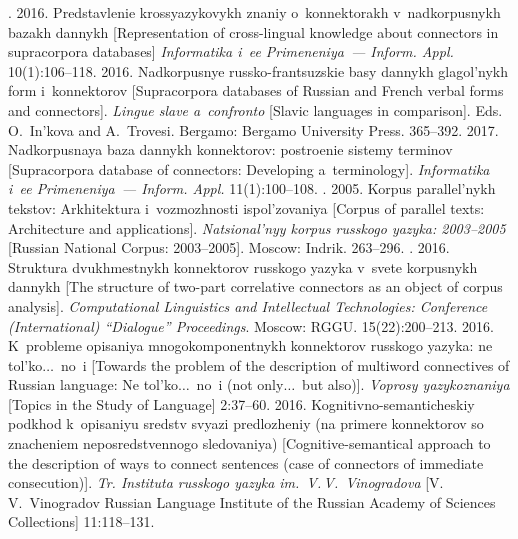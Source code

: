 \begin{multicols}{2}
{{\begin{thebibliography}{99}
. 2016. Predstavlenie krossyazykovykh zna\-niy 
o~konnektorakh v~nadkorpusnykh bazakh dannykh [Representation of  
cross-lingual knowledge about connectors in supracorpora databases] 
\textit{Informatika i~ee Primeneniya~--- Inform. Appl.} 10(1):106--118.
 2016. {Nad\-kor\-pus\-nye  
russko-frantsuzskie basy dannykh gla\-gol'\-nykh form i~konnektorov} 
[Supracorpora databases of Russian and French verbal forms and connectors]. 
\textit{Lingue slave a~confronto} [Slavic languages in comparison]. 
Eds. O.~In'kova and A.~Trovesi. Bergamo: 
Bergamo University Press. 365--392.
 2017. 
Nadkorpusnaya baza dannykh konnektorov: po\-stro\-enie sistemy terminov 
[Supracorpora database of connectors: Developing a~terminology]. 
\textit{Informatika i~ee Primeneniya~--- Inform. Appl.} 11(1):100--108.
. 2005. Korpus 
parallel'nykh tekstov: Arkhitektura i~voz\-mozh\-no\-sti ispol'zovaniya [Corpus of 
parallel texts: Architecture and applications]. \textit{Natsional'nyy korpus 
russkogo yazyka: 2003--2005} [Russian National Corpus: 2003--2005]. 
Moscow: Indrik. 263--296.
. 2016. Struktura dvukhmestnykh 
konnektorov russkogo yazyka v~svete kor\-pus\-nykh dannykh [The structure of 
two-part correlative connectors as an object of corpus analysis]. 
\textit{Computational Linguistics and 
Intellectual Technologies: Conference (International) ``Dialogue'' Proceedings}. 
Moscow: RGGU. 15(22):200--213.
 2016. K~probleme opisaniya mnogokomponentnykh 
konnektorov russkogo yazyka: ne tol'ko$\ldots$\  no~i [Towards the problem of 
the description of multiword connectives of Russian language: Ne 
tol'ko$\ldots$\  no~i (not only$\ldots$\  but also)]. \textit{Voprosy 
yazykoznaniya} [Topics in the Study of Language] 2:37--60.
 2016. Kognitivno-semanticheskiy podkhod 
k~opisaniyu sredstv svyazi predlozheniy (na primere konnektorov so 
znacheniem neposredstvennogo sle\-do\-va\-niya) [Cognitive-semantical approach 
to the description of ways to connect sentences (case of connectors of 
immediate consecution)]. \textit{Tr. Instituta russkogo yazyka im.\ 
V.\,V.~Vinogradova}
[V.\,V.~Vinogradov Russian Language Institute of the Russian Academy of 
Sciences Collections] 11:118--131.

\end{thebibliography}}}
\end{multicols}
